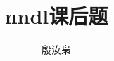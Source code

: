 \documentclass[12pt,a4paper]{article}
\begin{document}
\title{nndl课后题}
\author{殷汝枭}
\maketitle 








\end{document}
